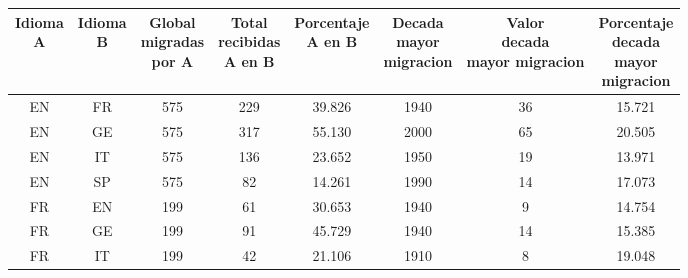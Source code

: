 \documentclass[10pt,letterpaper]{article} %
\begin{document}
\begin{table}
	\centering
	\begin{tabular}{cccccccc}
		\toprule
		\thead{Idioma \\ A} & \thead{Idioma \\ B} & \thead{Global \\ migradas \\ por A} & \thead{Total \\ recibidas \\ A en B} & \thead{Porcentaje \\ A en B} & \thead{Decada \\ mayor \\ migracion} & \thead{Valor \\decada \\ mayor migracion} & \thead{Porcentaje \\decada \\ mayor \\migracion} \\
		\midrule
		 EN &       FR &                    575 &                     229 &             39.826 &                    1940 &                            36 &                             15.721 \\
		EN &       GE &                    575 &                     317 &             55.130 &                    2000 &                            65 &                             20.505 \\
		EN &       IT &                    575 &                     136 &             23.652 &                    1950 &                            19 &                             13.971 \\
		EN &       SP &                    575 &                      82 &             14.261 &                    1990 &                            14 &                             17.073 \\
		FR &       EN &                    199 &                      61 &             30.653 &                    1940 &                             9 &                             14.754 \\
		FR &       GE &                    199 &                      91 &             45.729 &                    1940 &                            14 &                             15.385 \\
		FR &       IT &                    199 &                      42 &             21.106 &                    1910 &                             8 &                             19.048 \\

\end{tabular}
\end{table}
\end{document}
